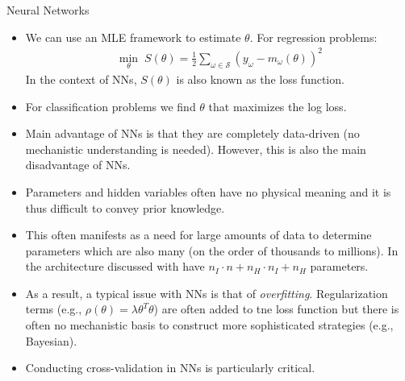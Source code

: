 \documentclass[handout,9pt]{beamer}
\begin{document}
\begin{frame}{Neural Networks}
\begin{itemize}
   \setlength{\itemsep}{5pt}
\item We can use an MLE framework to estimate $\theta$. For regression problems:
\begin{align*}
\min_{\theta}\; S(\theta)=\frac{1}{2}\sum_{\omega\in \mathcal{S}}(y_\omega - m_\omega(\theta))^2
\end{align*}
In the context of NNs, $S(\theta)$ is also known as the loss function.  
\item For classification problems we find $\theta$ that maximizes the log loss. 

\item Main advantage of NNs is that they are completely data-driven (no mechanistic understanding is needed). However, this is also the main disadvantage of NNs. 

\item Parameters and hidden variables often have no physical meaning and it is thus difficult to convey prior knowledge. 

\item This often manifests as a need for large amounts of data to determine parameters which are also many (on the order of thousands to millions). In the architecture discussed with have $n_I\cdot n+n_H\cdot n_I+n_H$ parameters.

\item As a result, a typical issue with NNs is that of {\em overfitting}.  Regularization terms (e.g., $\rho(\theta)=\lambda \theta^T\theta$) are often added to tne loss function but there is often no mechanistic basis to construct more sophisticated strategies (e.g., Bayesian). 

\item Conducting cross-validation in NNs is particularly critical. 

\end{itemize}

\end{frame}
\end{document}
